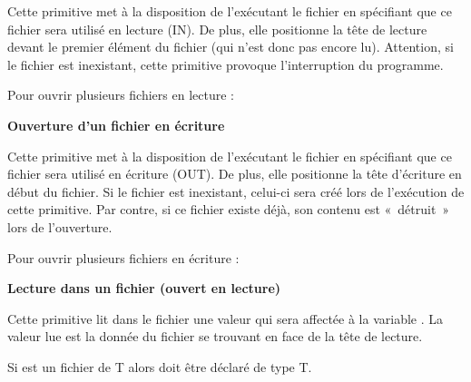 Cette primitive met à la disposition de l’exécutant le fichier
 en spécifiant que ce fichier sera
utilisé en lecture (IN). De plus, elle positionne la tête de lecture
devant le premier élément du fichier (qui n’est donc pas encore lu).
Attention, si le fichier  est inexistant,
cette primitive provoque l’interruption du programme. 

Pour ouvrir plusieurs fichiers en lecture :


{\sffamily\bfseries\upshape
Ouverture d’un fichier en écriture }


Cette primitive met à la disposition de l’exécutant le fichier
 en spécifiant que ce fichier sera
utilisé en écriture (OUT). De plus, elle positionne la tête d’écriture
en début du fichier. Si le fichier  est
inexistant, celui-ci sera créé lors de l’exécution de cette primitive.
Par contre, si ce fichier existe déjà, son contenu est «~détruit~» lors
de l'ouverture.

Pour ouvrir plusieurs fichiers en écriture :


{\sffamily\bfseries\upshape
Lecture dans un fichier (ouvert en lecture) }


Cette primitive lit dans le fichier  une
valeur qui sera affectée à la variable .
La valeur lue est la donnée du fichier se trouvant en face de la tête
de lecture. 

Si  est un fichier de T alors
 doit être déclaré de type T.

